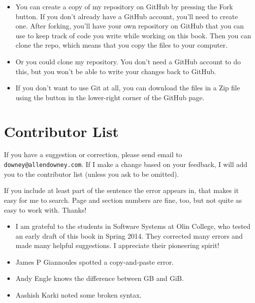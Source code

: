 \documentclass[12pt]{book}
\begin{document}
\begin{itemize}

\item You can create a copy of my repository
on GitHub by pressing the {\sf Fork} button.  If you don't already
have a GitHub account, you'll need to create one.  After forking, you'll
have your own repository on GitHub that you can use to keep track
of code you write while working on this book.  Then you can
clone the repo, which means that you copy the files
to your computer.

\item Or you could clone
my repository.  You don't need a GitHub account to do this, but you
won't be able to write your changes back to GitHub.

\item If you don't want to use Git at all, you can download the files
in a Zip file using the button in the lower-right corner of the
GitHub page.

\end{itemize}


\section*{Contributor List}


If you have a suggestion or correction, please send email to 
{\tt downey@allendowney.com}.  If I make a change based on your
feedback, I will add you to the contributor list
(unless you ask to be omitted).

If you include at least part of the sentence the
error appears in, that makes it easy for me to search.  Page and
section numbers are fine, too, but not quite as easy to work with.
Thanks!

\small

\begin{itemize}

\item I am grateful to the students in Software Systems at Olin
College, who tested an early draft of this book in Spring 2014.
They corrected many errors and made many helpful suggestions.
I appreciate their pioneering spirit!

\item James P Giannoules spotted a copy-and-paste error.

\item Andy Engle knows the difference between GB and GiB.

\item Aashish Karki noted some broken syntax.


\end{itemize}
\end{document}
